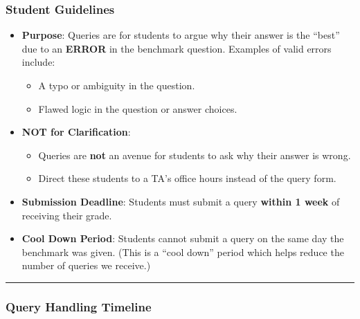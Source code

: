 \documentclass[
]{article}
\providecommand{\tightlist}{%
  \setlength{\itemsep}{0pt}\setlength{\parskip}{0pt}}
\begin{document}
\hypertarget{student-guidelines}{%
\subsubsection{Student Guidelines}\label{student-guidelines}}

\begin{itemize}
\tightlist
\item
  \textbf{Purpose}: Queries are for students to argue why their answer is the ``best'' due to an \textbf{ERROR} in the benchmark question. Examples of valid errors include:

  \begin{itemize}
  \tightlist
  \item
    A typo or ambiguity in the question.\\
  \item
    Flawed logic in the question or answer choices.\\
  \end{itemize}
\item
  \textbf{NOT for Clarification}:

  \begin{itemize}
  \tightlist
  \item
    Queries are \textbf{not} an avenue for students to ask why their answer is wrong.\\
  \item
    Direct these students to a TA's office hours instead of the query form.\\
  \end{itemize}
\item
  \textbf{Submission Deadline}: Students must submit a query \textbf{within 1 week} of receiving their grade.\\
\item
  \textbf{Cool Down Period}: Students cannot submit a query on the same day the benchmark was given. (This is a ``cool down'' period which helps reduce the number of queries we receive.)
\end{itemize}

\begin{center}\rule{0.5\linewidth}{0.5pt}\end{center}

\hypertarget{query-handling-timeline}{%
\subsubsection{Query Handling Timeline}\label{query-handling-timeline}}
\end{document}
